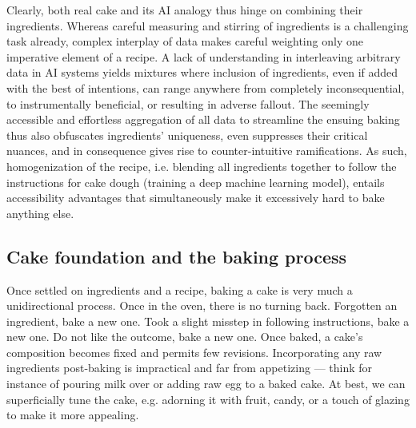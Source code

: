 \documentclass[manuscript,screen,authorversion,nonacm]{acmart}
\begin{document}
Clearly, both real cake and its AI analogy thus hinge on combining their ingredients. Whereas careful measuring and stirring of ingredients is a challenging task already, complex interplay of data makes careful weighting only one imperative element of a recipe. A lack of understanding in interleaving arbitrary data in AI systems yields mixtures where inclusion of ingredients, even if added with the best of intentions, can range anywhere from completely inconsequential, to instrumentally beneficial, or resulting in adverse fallout. The seemingly accessible and effortless aggregation of all data to streamline the ensuing baking thus also obfuscates ingredients' uniqueness, even suppresses their critical nuances, and in consequence gives rise to counter-intuitive ramifications. As such, homogenization of the recipe, i.e. blending all ingredients together to follow the instructions for cake dough (training a deep machine learning model), entails accessibility advantages that simultaneously make it excessively hard to bake anything else.    

\subsection{Cake foundation and the baking process}
Once settled on ingredients and a recipe, baking a cake is very much a unidirectional process. Once in the oven, there is no turning back. Forgotten an ingredient, bake a new one. Took a slight misstep in following instructions, bake a new one. 
Do not like the outcome, bake a new one.
Once baked, a cake's composition becomes fixed and permits few revisions.
Incorporating any raw ingredients post-baking is impractical and far from appetizing --- think for instance of pouring milk over or adding raw egg to a baked cake.
At best, we can superficially tune the cake, e.g. adorning it with fruit, candy, or a touch of glazing to make it more appealing.
\end{document}
